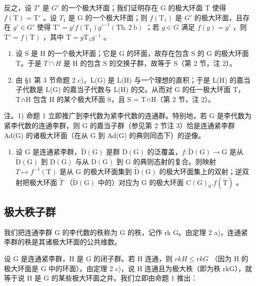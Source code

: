 反之，设 \(T'\) 是 \(G'\) 的一个极大环面；我们证明存在 G 的极大环面 T 使得 \(f(\mathrm{T}) = \mathrm{T}'\) 。设 \(T_{1}\) 是 G 的一个极大环面；则 \(f(\mathrm{T}_{1})\) 是 \(G'\) 的极大环面，且存在 \(g' \in G'\) 使得 \(\mathrm{T}' = g' f(\mathrm{T}_{1}) g'^{-1} (\mathrm{Th.~2~b})\) ；若 \(g \in G\) 满足 \(f(g) = g'\) ，则 \(\mathrm{T}' = f(\mathrm{T})\) ，其中 \(\mathrm{T} = g\mathrm{T}_{1}g^{-1}\) 。

\begin{enumerate}
\def\labelenumi{\alph{enumi})}
\setcounter{enumi}{1}
\item
  设 S 是 H 的一个极大环面；它是 G 的环面，故存在包含 S 的 G 的极大环面 T。于是 \(T \cap H\) 是 H 的包含 S 的交换子群，故等于 S（第 2 节，注 2）。
\item
  由 §1 第 3 节命题 2 c)，L(G) 是 L(H) 与一个理想的直积；于是 L(H) 的嘉当子代数是 L(G) 的嘉当子代数与 L(H) 的交。从而对 G 的任一极大环面 T，T∩H 包含 H 的某个极大环面 S，且 S = T∩H（第 2 节，注 2）。
\end{enumerate}

注。1) 命题 1 立即推广到李代数为紧李代数的连通群。特别地，若 G 是李代数为紧李代数的连通李群，则 G 的嘉当子群（参见第 2 节注 3）恰是连通紧李群 Ad(G) 的诸极大环面（在从 G 到 Ad(G) 的典则同态下）的逆像。

\begin{enumerate}
\def\labelenumi{\arabic{enumi})}
\setcounter{enumi}{1}
\tightlist
\item
  设 G 是连通紧李群，\(\widetilde{\mathrm{D}}(\mathrm{G})\) 是群 \(\mathrm{D}(\mathrm{G})\) 的泛覆盖，\(f : \widetilde{\mathrm{D}}(\mathrm{G}) \to \mathrm{G}\) 是从 \(\tilde{\mathrm{D}}(\mathrm{G})\) 到 \(\mathrm{D}(\mathrm{G})\) 与从 \(\mathrm{D}(\mathrm{G})\) 到 G 的典则态射的复合。则映射 \(T \mapsto f^{-1}(\mathrm{T})\) 是从 G 的极大环面集到 \(\tilde{\mathrm{D}}(\mathrm{G})\) 的极大环面集上的双射；逆双射把极大环面 \(\tilde{T}\) （\(\tilde{\mathrm{D}}(\mathrm{G})\) 中的）对应为 G 的极大环面 \(\mathrm{C}(\mathrm{G})_{0}.f(\tilde{\mathrm{T}})\) 。
\end{enumerate}

\subsection{极大秩子群}

我们把连通李群 G 的李代数的秩称为 G 的秩，记作 rk G。由定理 2 a)，连通紧李群的秩是其诸极大环面的公共维数。

设 G 是连通紧李群，H 是 G 的闭子群。若 H 连通，则 \(rkH \leq rkG\) （因为 H 的极大环面是 G 中的环面）。由定理 2 c)，说 H 连通且为极大秩（即为秩 rkG），就等于说 H 是 G 的某些极大环面之并。我们立即由命题 1 推出：

